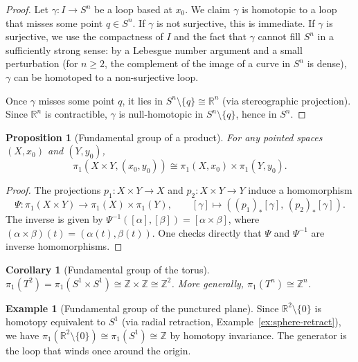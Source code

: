 \documentclass[12pt,a4paper,openany]{book}
\theoremstyle{definition}
\newtheorem{example}[definition]{Example}
\theoremstyle{plain}
\newtheorem{proposition}[definition]{Proposition}
\newtheorem{corollary}[definition]{Corollary}
\theoremstyle{remark}
\newcommand{\Z}{\mathbb{Z}}
\newcommand{\R}{\mathbb{R}}
\begin{document}
\begin{proof}
Let $\gamma \colon I \to S^n$ be a loop based at $x_0$. We claim $\gamma$ is
homotopic to a loop that misses some point $q \in S^n$. If $\gamma$ is not
surjective, this is immediate. If $\gamma$ is surjective, we use the
compactness of $I$ and the fact that $\gamma$ cannot fill $S^n$ in a
sufficiently strong sense: by a Lebesgue number argument and a small
perturbation (for $n \ge 2$, the complement of the image of a curve in $S^n$
is dense), $\gamma$ can be homotoped to a non-surjective loop.

Once $\gamma$ misses some point $q$, it lies in $S^n \setminus \{q\} \cong
\R^n$ (via stereographic projection). Since $\R^n$ is contractible, $\gamma$ is
null-homotopic in $S^n \setminus \{q\}$, hence in $S^n$.
\end{proof}

\begin{proposition}[Fundamental group of a product]\label{prop:pi1-product}
For any pointed spaces $(X, x_0)$ and $(Y, y_0)$,
\[
  \pi_1(X \times Y, (x_0, y_0)) \cong \pi_1(X, x_0) \times \pi_1(Y, y_0).
\]
\end{proposition}

\begin{proof}
The projections $p_1 \colon X \times Y \to X$ and $p_2 \colon X \times Y \to Y$
induce a homomorphism
\[
  \Psi \colon \pi_1(X \times Y) \to \pi_1(X) \times \pi_1(Y), \qquad
  [\gamma] \mapsto ((p_1)_*[\gamma],\, (p_2)_*[\gamma]).
\]
The inverse is given by $\Psi^{-1}([\alpha], [\beta]) = [\alpha \times \beta]$,
where $(\alpha \times \beta)(t) = (\alpha(t), \beta(t))$. One checks directly
that $\Psi$ and $\Psi^{-1}$ are inverse homomorphisms.
\end{proof}

\begin{corollary}[Fundamental group of the torus]\label{cor:pi1-torus}
$\pi_1(T^2) = \pi_1(S^1 \times S^1) \cong \Z \times \Z \cong \Z^2$.
More generally, $\pi_1(T^n) \cong \Z^n$.
\end{corollary}

\begin{example}[Fundamental group of the punctured plane]\label{ex:pi1-punctured-plane}
Since $\R^2 \setminus \{0\}$ is homotopy equivalent to $S^1$ (via radial
retraction, Example~\ref{ex:sphere-retract}), we have $\pi_1(\R^2 \setminus
\{0\}) \cong \pi_1(S^1) \cong \Z$ by homotopy invariance. The generator is the
loop that winds once around the origin.
\end{example}
\end{document}
